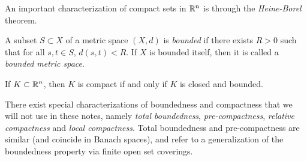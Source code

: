 An important characterization of compact sets in $\mathbb{R}^n$ is through the \emph{Heine-Borel} theorem.
\begin{definition}[Boundedness]
    A subset $S\subset X$ of a metric space $(X,d)$ is \emph{bounded} if there exists $R>0$ such that for all $s,t\in S$, $d(s,t)<R$. If $X$ is bounded itself, then it is called a \emph{bounded metric space}.
\end{definition}
\begin{theorem}
    If $K\subset\mathbb{R}^n$, then $K$ is compact if and only if $K$ is closed and bounded.  
\end{theorem}
There exist special characterizations of boundedness and compactness that we will not use in these notes, namely \emph{total boundedness}, \emph{pre-compactness}, \emph{relative compactness} and \emph{local compactness}. Total boundedness and pre-compactness are similar (and coincide in Banach spaces), and refer to a generalization of the boundedness property via finite open set coverings.


